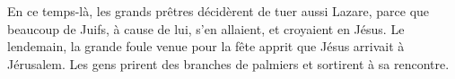 En ce temps-là, les grands prêtres décidèrent de tuer aussi Lazare,
	parce que beaucoup de Juifs, à cause de lui,
	s’en allaient, et croyaient en Jésus.
Le lendemain, la grande foule venue pour la fête
		apprit que Jésus arrivait à Jérusalem.
Les gens prirent des branches de palmiers et sortirent à sa rencontre.
